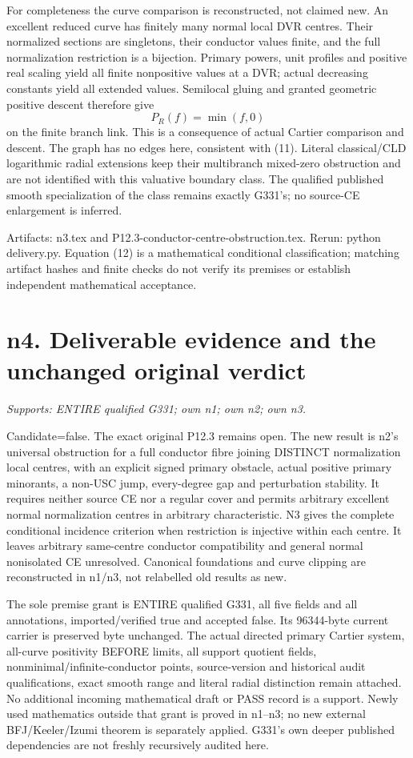 \documentclass[11pt]{article}
\begin{document}
For completeness the curve comparison is reconstructed, not claimed new.
An excellent reduced curve has finitely many normal local DVR centres.
Their normalized sections are singletons, their conductor values finite,
and the full normalization restriction is a bijection. Primary powers,
unit profiles and positive real scaling yield all finite nonpositive
values at a DVR; actual decreasing constants yield all extended values.
Semilocal gluing and granted geometric positive descent therefore give
\[
                           P_R(f)=\min(f,0)
\]
on the finite branch link. This is a consequence of actual Cartier
comparison and descent. The graph has no edges here, consistent with
(11). Literal classical/CLD logarithmic radial extensions keep their
multibranch mixed-zero obstruction and are not identified with this
valuative boundary class. The qualified published smooth specialization
of the class remains exactly G331's; no source-CE enlargement is inferred.

Artifacts: n3.tex and P12.3-conductor-centre-obstruction.tex. Rerun:
python delivery.py. Equation (12) is a mathematical conditional
classification; matching artifact hashes and finite checks do not
verify its premises or establish independent mathematical acceptance.

\section{n4. Deliverable evidence and the unchanged original verdict}
\textit{Supports: ENTIRE qualified G331; own n1; own n2; own n3.}

Candidate=false. The exact original P12.3 remains open. The new result is
n2's universal obstruction for a full conductor fibre joining DISTINCT
normalization local centres, with an explicit signed primary obstacle,
actual positive primary minorants, a non-USC jump, every-degree gap and
perturbation stability. It requires neither source CE nor a regular cover
and permits arbitrary excellent normal normalization centres in arbitrary
characteristic. N3 gives the complete conditional incidence criterion
when restriction is injective within each centre. It leaves arbitrary
same-centre conductor compatibility and general normal nonisolated CE
unresolved. Canonical foundations and curve clipping are reconstructed
in n1/n3, not relabelled old results as new.

The sole premise grant is ENTIRE qualified G331, all five fields and all
annotations, imported/verified true and accepted false. Its 96344-byte
current carrier is preserved byte unchanged. The actual directed primary
Cartier system, all-curve positivity BEFORE limits, all support quotient
fields, nonminimal/infinite-conductor points, source-version and historical
audit qualifications, exact smooth range and literal radial distinction
remain attached. No additional incoming mathematical draft or PASS record
is a support. Newly used mathematics outside that grant is proved in
n1--n3; no new external BFJ/Keeler/Izumi theorem is separately applied.
G331's own deeper published dependencies are not freshly recursively
audited here.
\end{document}
